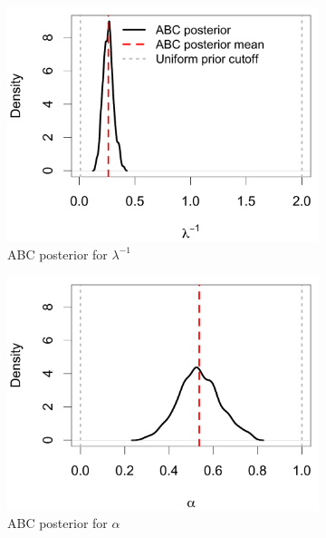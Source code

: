 \documentclass[12pt]{article}
\begin{document}
\begin{figure}[htbp]
\begin{subfigure}{0.32\textwidth}
\centering
\includegraphics[width = .95\textwidth]{figures/bate_marginal_k.pdf} 
\caption{ABC posterior for $\lambda^{-1}$}\label{subfig:bate_k}
\end{subfigure}
\begin{subfigure}{0.32\textwidth}
\centering
\includegraphics[width = .95\textwidth]{figures/bate_marginal_alpha.pdf} 
\caption{ABC posterior for $\alpha$}\label{subfig:bate_alpha}
\end{subfigure}
\begin{subfigure}{0.32\textwidth}
\centering

\end{subfigure}
\end{figure}
\end{document}
